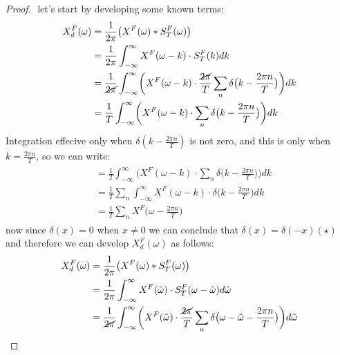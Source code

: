 \documentclass{article}
\begin{document}
\begin{proof}
    $ $\newline
    let's start by developing some known terms:
    \begin{equation}
        \begin{aligned}
            X_d^F(\omega) & = \frac{1}{2\pi}\big(X^F(\omega) \ast S^F_T (\omega)\big)\\
            & = \frac{1}{2\pi}\int_{-\infty}^{\infty}X^F(\omega-k)\cdot S^F_T(k) dk\\
            & = \frac{1}{\cancel{2\pi}}\int_{-\infty}^{\infty}\biggl(X^F(\omega-k)\cdot \frac{\cancel{2\pi}}{T}\sum_n \delta\big(k-\frac{2\pi n}{T}\big) \biggr)dk\\
            & = \frac{1}{T}\int_{-\infty}^{\infty}\biggl(X^F(\omega-k)\cdot\sum_n \delta\big(k-\frac{2\pi n}{T}\big) \biggr)dk\\
        \end{aligned}
    \end{equation}
    Integration effecive only when $\delta(k-\frac{2\pi n}{T})$ is not zero, and this is only when $k=\frac{2\pi n}{T}$, so we can write:
    \begin{equation}
        \begin{aligned}
            \begin{aligned}
                & = \frac{1}{T}\int_{-\infty}^{\infty}\biggl(X^F(\omega-k)\cdot\sum_n \delta\big(k-\frac{2\pi n}{T}\big) \biggr)dk\\
                & = \frac{1}{T}\sum_n \int_{-\infty}^{\infty}X^F(\omega-k)\cdot \delta\big(k-\frac{2\pi n}{T}\big) dk\\
                & = \frac{1}{T}\sum_n X^F\bigg(\omega - \frac{2\pi n}{T}\bigg)
            \end{aligned}
        \end{aligned}
    \end{equation}
    now since $\delta(x) = 0$ when $x \neq 0$ we can conclude that $\delta(x) = \delta(-x) (\star)$ and therefore we can develop $X_d^F(\omega)$ as follows:
    \begin{equation}
        \begin{aligned}
            X_d^F(\omega) & = \frac{1}{2\pi}\big(X^F(\omega) \ast S^F_T (\omega)\big)\\
            & = \frac{1}{2\pi}\int_{-\infty}^{\infty}X^F(\tilde{\omega})\cdot S^F_T(\omega-\tilde{\omega}) d\tilde{\omega}\\
            & = \frac{1}{\cancel{2\pi}}\int_{-\infty}^{\infty}\biggl(X^F(\tilde{\omega})\cdot \frac{\cancel{2\pi}}{T}\sum_n \delta\big(\omega-\tilde{\omega}-\frac{2\pi n}{T}\big) \biggr)d\tilde{\omega}\\

\end{aligned}
\end{equation}
\end{proof}
\end{document}
